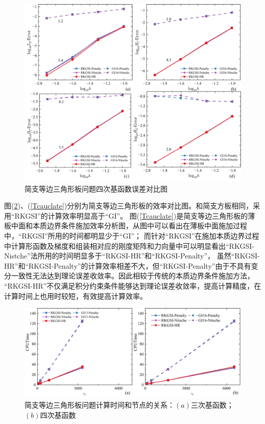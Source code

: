     \begin{figure}
        \centering
        \includegraphics[scale=0.6]{figure/P/T/QLH.png}
        \caption{简支等边三角形板问题四次基函数误差对比图}\label{TQLH}
\end{figure}\newpage
图(\ref{Tcputime})、(\ref{Tcauclate})分别为简支等边三角形板的效率对比图。和简支方板相同，采用“RKGSI”的计算效率明显高于“GI”。
图(\ref{Tcauclate})是简支等边三角形板的薄板中面和本质边界条件施加效率分析图，从图中可以看出在薄板中面施加过程中，“RKGSI”所用的时间都明显少于“GI”；
而针对“RKGSI”在施加本质边界过程中计算形函数及梯度和组装相对应的刚度矩阵和力向量中可以明显看出“RKGSI-Nistche”法所用的时间明显多于“RKGSI-HR”和“RKGSI-Penalty”，
虽然“RKGSI-HR”和“RKGSI-Penalty”的计算效率相差不大，但“RKGSI-Penalty”由于不具有变分一致性无法达到理论误差收敛率。因此相较于传统的本质边界条件施加方法，
“RKGSI-HR”不仅满足积分约束条件能够达到理论误差收敛率，提高计算精度，在计算时间上也用时较短，有效提高计算效率。\par
\begin{figure}[!h]
    \centering
    \includegraphics[scale=0.6]{figure/P/T/cputime.png}
    \caption{简支等边三角形板问题计算时间和节点的关系：$(a)$三次基函数；$(b)$四次基函数}\label{Tcputime}
\end{figure}
